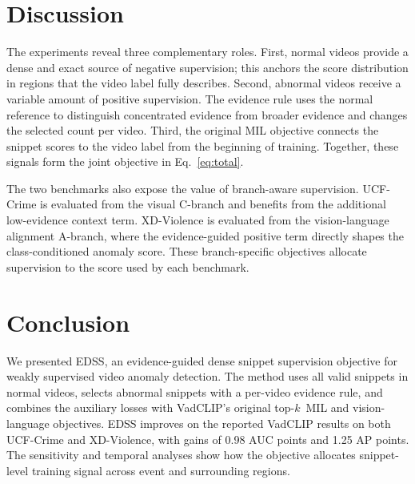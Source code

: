 \documentclass[preprint,12pt]{elsarticle}
\newcommand{\topk}{top-$k$\ }
\begin{document}
\section{Discussion}
\label{sec:discussion}

The experiments reveal three complementary roles. First, normal videos provide a dense and exact source of negative supervision; this anchors the score distribution in regions that the video label fully describes. Second, abnormal videos receive a variable amount of positive supervision. The evidence rule uses the normal reference to distinguish concentrated evidence from broader evidence and changes the selected count per video. Third, the original MIL objective connects the snippet scores to the video label from the beginning of training. Together, these signals form the joint objective in Eq.~\eqref{eq:total}.

The two benchmarks also expose the value of branch-aware supervision. UCF-Crime is evaluated from the visual C-branch and benefits from the additional low-evidence context term. XD-Violence is evaluated from the vision-language alignment A-branch, where the evidence-guided positive term directly shapes the class-conditioned anomaly score. These branch-specific objectives allocate supervision to the score used by each benchmark.

\section{Conclusion}
\label{sec:conclusion}

We presented EDSS, an evidence-guided dense snippet supervision objective for weakly supervised video anomaly detection. The method uses all valid snippets in normal videos, selects abnormal snippets with a per-video evidence rule, and combines the auxiliary losses with VadCLIP's original \topk MIL and vision-language objectives. EDSS improves on the reported VadCLIP results on both UCF-Crime and XD-Violence, with gains of 0.98 AUC points and 1.25 AP points. The sensitivity and temporal analyses show how the objective allocates snippet-level training signal across event and surrounding regions.



\end{document}
